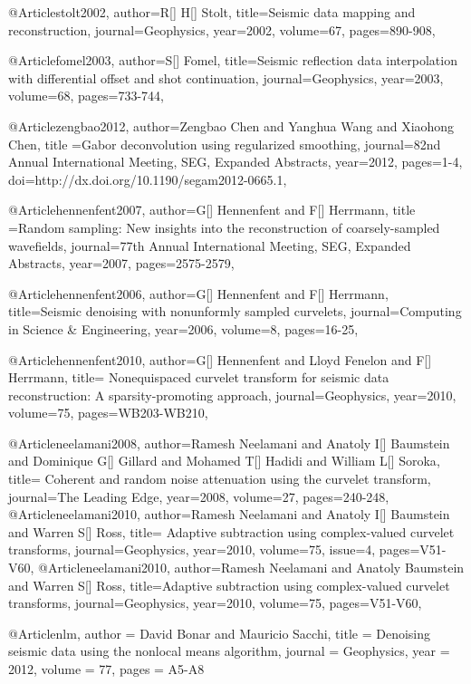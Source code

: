 {@Article{stolt2002,
  author={R[] H[] Stolt},
  title={Seismic data mapping and reconstruction},
  journal={Geophysics},
  year=2002,
  volume=67,
  pages={890-908},
}


@Article{fomel2003,
  author={S[] Fomel},
  title={Seismic reflection data interpolation with differential offset and shot continuation},
  journal={Geophysics},
  year=2003,
  volume=68,
  pages={733-744},
}

@Article{zengbao2012,
  author={Zengbao Chen and Yanghua Wang and Xiaohong Chen},
  title ={Gabor deconvolution using regularized smoothing},
  journal={82nd Annual International Meeting, SEG, Expanded Abstracts},
  year=2012,
  pages={1-4},
  doi={http://dx.doi.org/10.1190/segam2012-0665.1},
}

@Article{hennenfent2007,
  author={G[] Hennenfent and F[] Herrmann},
  title ={Random sampling: New insights into the reconstruction of coarsely-sampled wavefields},
  journal={77th Annual International Meeting, SEG, Expanded Abstracts},
  year=2007,
  pages={2575-2579},
}

@Article{hennenfent2006,
  author={G[] Hennenfent and F[] Herrmann},
  title={Seismic denoising with nonunformly sampled curvelets},
  journal={Computing in Science \& Engineering},
  year=2006,
  volume=8,
  pages={16-25},
}

@Article{hennenfent2010,
  author={G[] Hennenfent and Lloyd Fenelon and F[] Herrmann},
  title={	
Nonequispaced curvelet transform for seismic data reconstruction: A sparsity-promoting approach},
  journal={Geophysics},
  year=2010,
  volume=75,
  pages={WB203-WB210},
}

@Article{neelamani2008,
  author={Ramesh Neelamani and Anatoly I[] Baumstein and Dominique G[] Gillard and Mohamed T[] Hadidi and William L[] Soroka},
  title={	
Coherent and random noise attenuation using the curvelet transform},
  journal={The Leading Edge},
  year=2008,
  volume=27,
  pages={240-248},
}
@Article{neelamani2010,
  author={Ramesh Neelamani and Anatoly I[] Baumstein and Warren S[] Ross},
  title={		
Adaptive subtraction using complex-valued curvelet transforms},
  journal={Geophysics},
  year=2010,
  volume=75,
  issue=4,
  pages={V51-V60},
}
@Article{neelamani2010,
  author={Ramesh Neelamani and Anatoly Baumstein and Warren S[] Ross},
  title={Adaptive subtraction using complex-valued curvelet transforms},
  journal={Geophysics},
  year=2010,
  volume=75,
  pages={V51-V60},
}


@Article{nlm,
  author = 	 {David Bonar and Mauricio Sacchi},
  title = 	 {Denoising seismic data using the nonlocal means algorithm},
  journal = 	 {Geophysics},
  year = 	 2012,
  volume =	 77,
  pages =	 {A5-A8}
}

}
